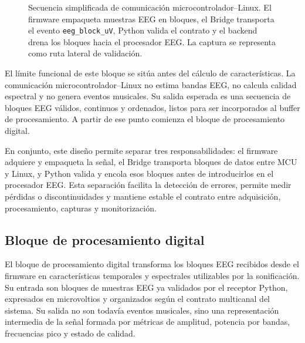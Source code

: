 \documentclass[../main.tex]{subfiles}
\begin{document}
\begin{figure}[H]
    \caption{Secuencia simplificada de comunicación microcontrolador--Linux. El firmware empaqueta muestras EEG en bloques, el Bridge transporta el evento \texttt{eeg\_block\_uV}, Python valida el contrato y el backend drena los bloques hacia el procesador EEG. La captura se representa como ruta lateral de validación.}
    \label{fig:comunicacion_mcu_linux}
\end{figure}

El límite funcional de este bloque se sitúa antes del cálculo de características. La comunicación microcontrolador--Linux no estima bandas EEG, no calcula calidad espectral y no genera eventos musicales. Su salida esperada es una secuencia de bloques EEG válidos, continuos y ordenados, listos para ser incorporados al buffer de procesamiento. A partir de ese punto comienza el bloque de procesamiento digital.

En conjunto, este diseño permite separar tres responsabilidades: el firmware adquiere y empaqueta la señal, el Bridge transporta bloques de datos entre MCU y Linux, y Python valida y encola esos bloques antes de introducirlos en el procesador EEG. Esta separación facilita la detección de errores, permite medir pérdidas o discontinuidades y mantiene estable el contrato entre adquisición, procesamiento, capturas y monitorización.

\subsection{Bloque de procesamiento digital}

El bloque de procesamiento digital transforma los bloques EEG recibidos desde el firmware en características temporales y espectrales utilizables por la sonificación. Su entrada son bloques de muestras EEG ya validados por el receptor Python, expresados en microvoltios y organizados según el contrato multicanal del sistema. Su salida no son todavía eventos musicales, sino una representación intermedia de la señal formada por métricas de amplitud, potencia por bandas, frecuencias pico y estado de calidad.
\end{document}
